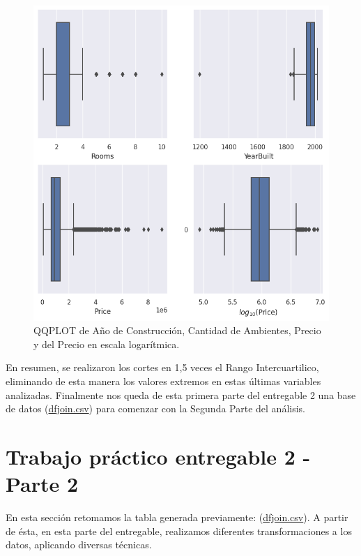 \begin{figure} [!ht]
\begin{center}
\includegraphics[width=1.0\columnwidth]{img/boxx4.png}
\caption{QQPLOT de Año de Construcción, Cantidad de Ambientes, Precio y del Precio en escala logarítmica.}
\label{box3}
\end{center}
\end{figure}

En resumen, se realizaron los cortes en 1,5 veces el Rango Intercuartilico, eliminando de esta manera los valores extremos en estas últimas variables analizadas. Finalmente nos queda de esta primera parte del entregable 2 una base de datos (\href{https://raw.githubusercontent.com/sebascoca/DiploDatos2023/main/AnalisisYCuracion/Practico/dfjoin.csv}{dfjoin.csv}) para comenzar con la Segunda Parte del análisis.

\clearpage

 \section*{Trabajo práctico entregable 2 - Parte 2}

En esta sección retomamos la tabla generada previamente: (\href{https://raw.githubusercontent.com/sebascoca/DiploDatos2023/main/AnalisisYCuracion/Practico/dfjoin.csv}{dfjoin.csv}). A partir de ésta, en esta parte del entregable, realizamos diferentes transformaciones a los datos, aplicando diversas técnicas. 


